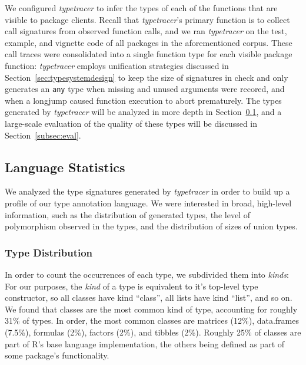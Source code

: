 \documentclass[acmsmall,review,anonymous]{acmart}\settopmatter{printfolios=true,printccs=false,printacmref=false}
\newcommand{\code}[1]{{\lstinline[style=Rin]!#1!}\xspace}
\newcommand{\typetracer}{\emph{typetracer}\xspace} %
\begin{document}
We configured \typetracer to infer the types of each of the functions that are visible to package clients.
Recall that \typetracer's primary function is to collect call signatures from observed function calls, and we ran \typetracer on the test, example, and vignette code of all packages in the aforementioned corpus.
These call traces were consolidated into a single function type for each visible package function:
\typetracer employs unification strategies discussed in Section~\ref{sec:typesystemdesign} to keep the size of signatures in check and only generates an \code{any} type when missing and unused arguments were recored, and when a longjump caused function execution to abort prematurely.
The types generated by \typetracer will be analyzed in more depth in Section~\ref{subsec:stats}, and a large-scale evaluation of the quality of these types will be discussed in Section~\ref{subsec:eval}.

%
%
%
%
\subsection{Language Statistics}
\label{subsec:stats}


We analyzed the type signatures generated by \typetracer in order to build up a profile of our type annotation language.
We were interested in broad, high-level information, such as the distribution of generated types, the level of polymorphism observed in the types, and the distribution of sizes of union types.

%
%
\subsubsection{Type Distribution}


In order to count the occurrences of each type, we subdivided them into {\it kinds}: 
For our purposes, the {\it kind} of a type is equivalent to it's top-level type constructor, so all classes have kind ``class'', all lists have kind ``list'', and so on.
We found that classes are the most common kind of type, accounting for roughly 31\% of types.
In order, the most common classes are matrices (12\%), data.frames (7.5\%), formulas (2\%), factors (2\%), and tibbles (2\%).
Roughly 25\% of classes are part of R's base language implementation, the others being defined as part of some package's functionality.
\end{document}
